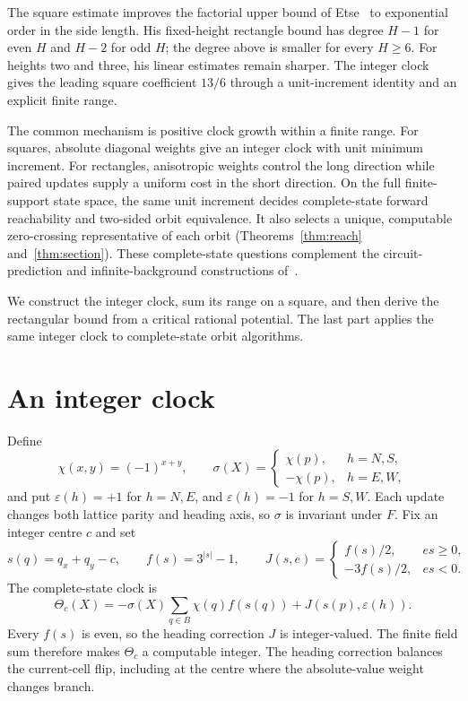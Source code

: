 \documentclass[11pt,a4paper]{article}
\theoremstyle{remark}\newtheorem{remark}[theorem]{Remark}
\newcommand{\eps}{\varepsilon}\newcommand{\symdiff}{\mathbin{\triangle}}
\begin{document}
The square estimate improves the factorial upper bound of
Etse~\cite{Etse2026} to exponential order in the side length. His fixed-height
rectangle bound has degree $H-1$ for even $H$ and $H-2$ for odd $H$; the degree
above is smaller for every $H\ge6$. For heights two and three, his linear
estimates remain sharper. The integer clock gives the leading square
coefficient $13/6$ through a unit-increment identity and an explicit finite range.

The common mechanism is positive clock growth within a finite range.
For squares, absolute diagonal weights give an integer clock with unit minimum
increment. For rectangles, anisotropic weights control the long direction
while paired updates supply a uniform cost in the short direction.
On the full finite-support state space, the same unit increment decides
complete-state forward reachability and two-sided orbit equivalence. It also
selects a unique, computable zero-crossing representative of each orbit
(Theorems~\ref{thm:reach} and~\ref{thm:section}).
These complete-state questions complement the circuit-prediction and
infinite-background constructions of~\cite{Gajardo2002}.

We construct the integer clock, sum its range on a square, and then derive the
rectangular bound from a critical rational potential. The last part applies
the same integer clock to complete-state orbit algorithms.

\section{An integer clock}
Define
\[
 \chi(x,y)=(-1)^{x+y},\qquad
 \sigma(X)=\begin{cases}\chi(p),&h=N,S,\\-\chi(p),&h=E,W,\end{cases}
\]
and put $\eps(h)=+1$ for $h=N,E$, and $\eps(h)=-1$ for $h=S,W$.
Each update changes both lattice parity and heading axis, so $\sigma$ is
invariant under $F$. Fix an integer centre $c$ and set
\[
 s(q)=q_x+q_y-c,\qquad f(s)=3^{|s|}-1,\qquad
 J(s,e)=\begin{cases}f(s)/2,&es\ge0,\\-3f(s)/2,&es<0.\end{cases}
\]
The complete-state clock is
\begin{equation}\label{eq:integer}
 \Theta_c(X)=-\sigma(X)\sum_{q\in B}\chi(q)f(s(q))
                +J(s(p),\eps(h)).
\end{equation}
Every $f(s)$ is even, so the heading correction $J$ is integer-valued.
The finite field sum therefore makes $\Theta_c$ a computable integer.
The heading correction balances the current-cell flip, including at the
centre where the absolute-value weight changes branch.
\end{document}
